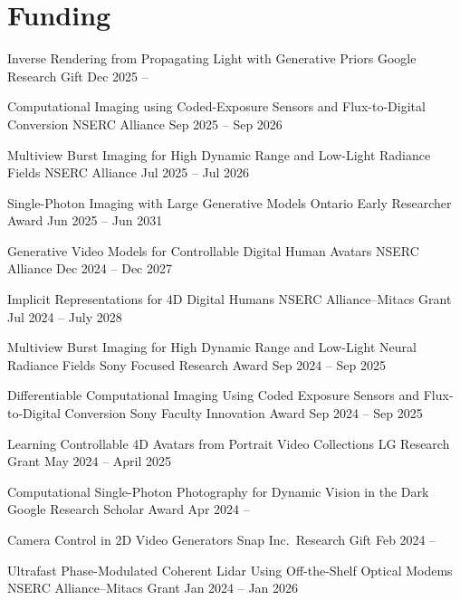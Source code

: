 
\section{Funding}
\begingroup
\let\bfseries\relax

\cventry[0.5em]{}
{Inverse Rendering from Propagating Light with Generative Priors}
{Google Research Gift}
{Dec 2025 --}
{}
{}

\cventry[0.5em]{}
{Computational Imaging using Coded-Exposure Sensors and Flux-to-Digital Conversion}
{NSERC Alliance}
{Sep 2025 -- Sep 2026}
{}
{}

\cventry[0.5em]{}
{Multiview Burst Imaging for High Dynamic Range and Low-Light Radiance Fields}
{NSERC Alliance}
{Jul 2025 -- Jul 2026}
{}
{}

\cventry[0.5em]{}
{Single-Photon Imaging with Large Generative Models}
{Ontario Early Researcher Award}
{Jun 2025 -- Jun 2031}
{}
{}

\cventry[0.5em]{}
{Generative Video Models for Controllable Digital Human Avatars}
{NSERC Alliance}
{Dec 2024 -- Dec 2027}
{}
{}

\cventry[0.5em]{}
{Implicit Representations for 4D Digital Humans}
{NSERC Alliance--Mitacs Grant}
{Jul 2024 -- July 2028}
{}
{}

\cventry[0.5em]{}
{\small Multiview Burst Imaging for High Dynamic Range and Low-Light Neural Radiance Fields}
{Sony Focused Research Award}
{Sep 2024 -- Sep 2025}
{}
{}

\cventry[0.5em]{}
{\small Differentiable Computational Imaging Using Coded Exposure Sensors and Flux-to-Digital Conversion}
{Sony Faculty Innovation Award}
{\hspace{-1em}Sep 2024 -- Sep 2025}
{}
{}

\cventry[0.5em]{}
{Learning Controllable 4D Avatars from Portrait Video Collections}
{LG Research Grant}
{May 2024 -- April 2025}
{}
{}

\cventry[0.5em]{}
{Computational Single-Photon Photography for Dynamic Vision in the Dark}
{Google Research Scholar Award}
{Apr 2024 --}
{}
{}

\cventry[0.5em]{}
{Camera Control in 2D Video Generators}
{Snap Inc.\ Research Gift}
{Feb 2024 --}
{}
{}

\cventry[0.5em]{}
{Ultrafast Phase-Modulated Coherent Lidar Using Off-the-Shelf Optical Modems}
{NSERC Alliance--Mitacs Grant}
{Jan 2024 -- Jan 2026}
{}
{}

